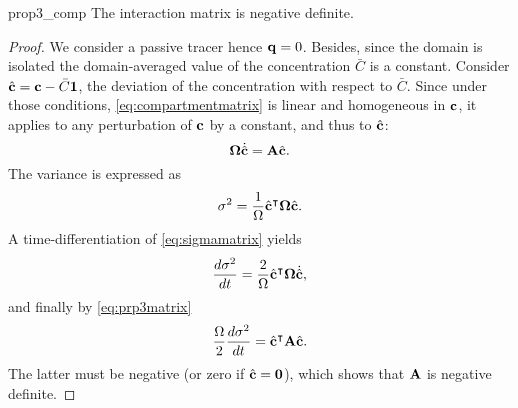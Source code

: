 \begin{propertybis}{prop3_comp} \label{prop3bis_comp}
	The interaction matrix is negative definite.
\end{propertybis}
\begin{proof}
	We consider a passive tracer hence $\mathbf q = 0$. Besides, since the domain is isolated the domain-averaged value of the concentration $\bar C$ is a constant.
	Consider $\hat{\mathbf c} = \mathbf c - \bar C \mathbf 1$, the deviation of the concentration with respect to $\bar C$. Since under those conditions, \eqref{eq:compartmentmatrix} is linear and homogeneous in $\mathbf c$, it applies to any perturbation of $\mathbf c$ by a constant, and thus to $\hat{\mathbf c}$:
	\begin{equation} \label{eq:prp3matrix}
		\boldsymbol \Omega \dot{\hat{\mathbf c}} = \mathbf A \hat{\mathbf c}.
	\end{equation}
	The variance is expressed as
	\begin{equation}\label{eq:sigmamatrix}
		\sigma^2 = \frac{1}{\Omega} \hat{\mathbf c}^\intercal \boldsymbol \Omega \hat{\mathbf c}.
	\end{equation}
	A time-differentiation of \eqref{eq:sigmamatrix} yields
	\begin{equation}
		\frac{d \sigma^2}{dt} = \frac{2}{\Omega} \hat{\mathbf c}^\intercal \boldsymbol \Omega \dot{\hat{\mathbf c}},
	\end{equation}
	and finally by \eqref{eq:prp3matrix}
	\begin{equation}
		\frac{\Omega}{2} \frac{d \sigma^2}{dt} = \hat{\mathbf c}^\intercal \mathbf A \hat{\mathbf c}.
	\end{equation}
	The latter must be negative (or zero if $\hat{\mathbf c} = \mathbf 0$), which shows that $\mathbf A$ is negative definite.
\end{proof}

